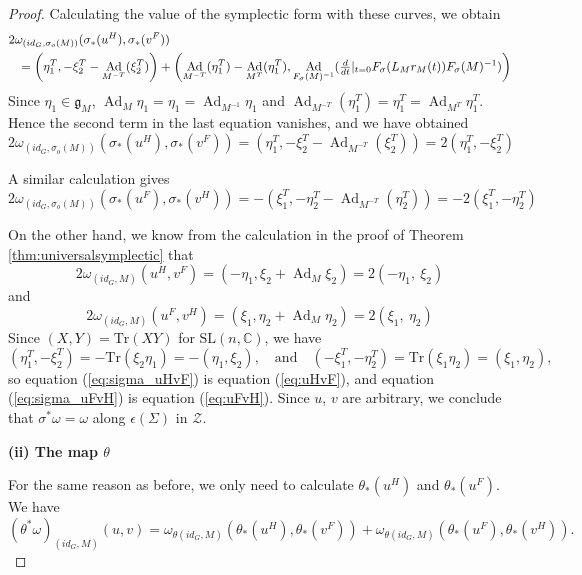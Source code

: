 \documentclass[10pt,a4paper]{amsart}
\DeclareMathOperator{\Ad}{Ad}
\newcommand{\SL}{\textrm{SL}}
\newcommand{\Tr}{\mathrm{Tr}}
\newcommand{\bC}{\mathbb{C}}
\newcommand{\cZ}{\mathcal{Z}}
\newcommand{\fg}{\mathfrak{g}}
\begin{document}
\begin{proof}
Calculating the value of the symplectic form with these curves, we obtain
\begin{eqnarray*}
\lefteqn{2 \omega_{(id_G,\sigma_o(M))}(\sigma_*(u^H),\sigma_*(v^F)) }\\
&&=\left( \eta_1^T,-\xi_2^T-\Ad_{M^{-T}}(\xi_2^T) \right)+\left( \Ad_{M^{-T}} (\eta_1^T) -\Ad_{M^T} (\eta_1^T), \Ad_{F_\sigma(M)^{-1}}( \tfrac{d}{dt}|_{t=0} F_\sigma(L_Mr_M(t))F_\sigma(M)^{-1}) \right)
\end{eqnarray*}
Since $\eta_1\in\fg_M$, $\Ad_M\eta_1=\eta_1=\Ad_{M^{-1}}\eta_1$ and $\Ad_{M^{-T}}(\eta_1^T)=\eta_1^T=\Ad_{M^T}\eta^T_1$. 
Hence the second term in the last equation vanishes, and we have obtained
\begin{equation}\label{eq:sigma_uHvF}
2\omega_{(id_G,\sigma_o(M) )}(\sigma_*(u^H),\sigma_*(v^F))=(\eta_1^T,-\xi_2^T-\Ad_{M^{-T}}(\xi_2^T) )=2(\eta_1^T, -\xi_2^T)
\end{equation}

A similar calculation gives 
\begin{equation}\label{eq:sigma_uFvH}
2\omega_{(id_G, \sigma_o(M) )}(\sigma_*(u^F),\sigma_*(v^H))=-(\xi_1^T,-\eta_2^T-\Ad_{M^{-T}}(\eta_2^T) )=-2(\xi_1^T,-\eta_2^T)
\end{equation}

On the other hand, we know from the calculation in the proof of Theorem \ref{thm:universalsymplectic} that
\begin{equation}\label{eq:uHvF}
2\omega_{(id_G,M)}(u^H,v^F)=(-\eta_1,\xi_2+\Ad_M\xi_2)=2(-\eta_1,\ \xi_2)
\end{equation}
and
\begin{equation}\label{eq:uFvH}
2\omega_{(id_G,M)}(u^F,v^H)=(\xi_1,\eta_2+\Ad_M\eta_2)=2(\xi_1,\ \eta_2)
\end{equation}
Since $(X,Y)=\Tr(XY)$ for $\SL(n,\bC)$, we have
$$(\eta_1^T,-\xi_2^T )=-\Tr(\xi_2\eta_1)=-(\eta_1,\xi_2), \quad\mbox{and}\quad (-\xi_1^T,-\eta_2^T)=\Tr(\xi_1\eta_2)=(\xi_1,\eta_2),$$
so equation (\ref{eq:sigma_uHvF}) is equation (\ref{eq:uHvF}), and equation (\ref{eq:sigma_uFvH}) is equation (\ref{eq:uFvH}). 
Since $u$, $v$ are arbitrary, we conclude that $\sigma^*\omega=\omega$ along $\epsilon(\Sigma)$ in $\cZ$.

{\bf (ii) The map $\theta$}

For the same reason as before, we only need to calculate $\theta_*(u^H)$ and $\theta_*(u^F)$.
We have
\[(\theta^*\omega)_{(id_G,M)}(u,v)
=\omega_{\theta(id_G,M)}(\theta_*(u^H),\theta_*(v^F))+\omega_{\theta(id_G,M)}(\theta_*(u^F),\theta_*(v^H)).
\]


\end{proof}
\end{document}
